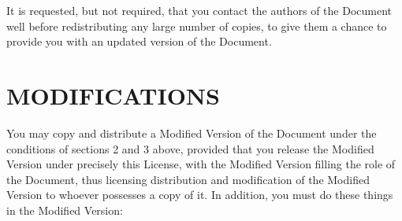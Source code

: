 \documentclass{stacks-project-book}
\theoremstyle{plain}
\theoremstyle{definition}
\theoremstyle{remark}
\numberwithin{equation}{subsection}
\begin{document}
It is requested, but not required, that you contact the authors of the
Document well before redistributing any large number of copies, to give
them a chance to provide you with an updated version of the Document.


\section{MODIFICATIONS}
\label{fdl-section-modifications}

You may copy and distribute a Modified Version of the Document under
the conditions of sections 2 and 3 above, provided that you release
the Modified Version under precisely this License, with the Modified
Version filling the role of the Document, thus licensing distribution
and modification of the Modified Version to whoever possesses a copy
of it.  In addition, you must do these things in the Modified Version:
\end{document}
